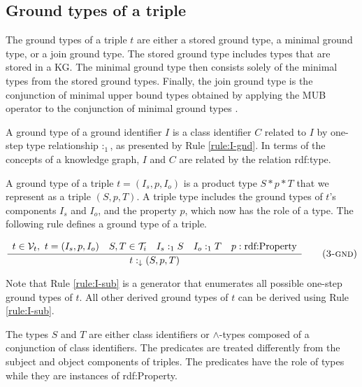 \documentclass[runningheads]{llncs}
\newcommand{\darr}{\downarrow}
\newcommand{\V}{{\cal V}}
\newcommand{\TT}{{\cal T}}
\newcommand{\memo}[1]{}
\begin{document}
\subsection{Ground types of a triple\label{sec:3-ground-types}}

\noindent
The ground types of a triple $t$ are either a stored ground type, a
minimal ground type, or a join ground type. The stored ground type
includes types that are stored in a KG. The minimal ground type then
consists solely of the minimal types from the stored ground
types. Finally, the join ground type is the conjunction of minimal
upper bound types obtained by applying the MUB operator to the conjunction
of minimal ground types \cite{Knudstorp2024}.
 
A ground type of a ground identifier $I$ is a class identifier $C$
related to $I$ by one-step type relationship $:_1$, as presented
by Rule \ref{rule:I-gnd}. In terms of the concepts of a
knowledge graph, $I$ and $C$ are related by the relation rdf:type.

A ground type of a triple $t=(I_s,p,I_o)$ is a product type $S*p*T$
that we represent as a triple $(S,p,T)$. A triple type includes the
ground types of $t$'s components $I_s$ and $I_o$, and the property
$p$, which now has the role of a type. The following rule defines a
ground type of a triple.

\begin{equation}
\dfrac{\begin{array}{c}
       t\in\V_t,\ t=(I_s,p,I_o)\quad
       S,T\in\TT_i\quad I_s:_1S\quad I_o:_1T\quad p:\text{rdf:Property}
       \end{array}}
       {t:_\darr(S,p,T)}
\tag{\textsc{3-gnd}}\label{rule:3-gnd}
\end{equation}

Note that Rule \ref{rule:I-sub} is a generator that enumerates all
possible one-step ground types of $t$. All other derived ground types
of $t$ can be derived using Rule \ref{rule:I-sub}.

\memo{Somewhere at the beginning to place the description of the role
  of a type as ground and as schema type. The types are types and they
  can have two different roles. To be a ground type means that the
  type is derived from the stored KG types of identifiers. To be a
  schema types means that the type is defined by the used in the form
  of a schema.}

The types $S$ and $T$ are either class identifiers or $\land$-types
composed of a conjunction of class identifiers. The predicates are
treated differently from the subject and object components of
triples. The predicates have the role of types while they are
instances of rdf:Property.
\end{document}
